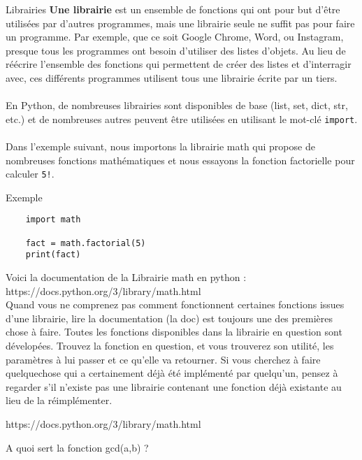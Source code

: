 \begin{section}{Librairies}
    \textbf{Une librairie} est un ensemble de fonctions qui ont pour but d'être utilisées par d'autres programmes, mais une librairie seule ne suffit pas pour faire un programme. Par exemple, que ce soit Google Chrome, Word, ou Instagram, presque tous les programmes ont besoin d'utiliser des listes d'objets. Au lieu de réécrire l'ensemble des fonctions qui permettent de créer des listes et d'interragir avec, ces différents programmes utilisent tous une librairie écrite par un tiers.
\\\\
En Python, de nombreuses librairies sont disponibles de base (list, set, dict, str, etc.) et de nombreuses autres peuvent être utilisées en utilisant le mot-clé \lstinline{import}.
\\\\
Dans l'exemple suivant, nous importons la librairie math qui propose de nombreuses fonctions mathématiques et nous essayons la fonction factorielle pour calculer \lstinline{5!}.
\begin{Example}{\faTerminal Exemple}
    \begin{lstlisting}
    import math

    fact = math.factorial(5)
    print(fact)\end{lstlisting}
\end{Example}

Voici la documentation de la Librairie math en python : https://docs.python.org/3/library/math.html \\

Quand vous ne comprenez pas comment fonctionnent certaines fonctions issues d'une librairie, lire la documentation (la doc) est toujours une des premières chose à faire. Toutes les fonctions disponibles dans la librairie en question sont dévelopées. Trouvez la fonction en question, et vous trouverez son utilité, les paramètres à lui passer et ce qu'elle va retourner. Si vous cherchez à faire quelquechose qui a certainement déjà été implémenté par quelqu'un, pensez à regarder s'il n'existe pas une librairie contenant une fonction déjà existante au lieu de la réimplémenter. \\

\begin{conseil}
	https://docs.python.org/3/library/math.html
\end{conseil} 


\begin{Exercice}[5 minutes]
	A quoi sert la fonction gcd(a,b) ? 
\end{Exercice} \\


\end{section}
